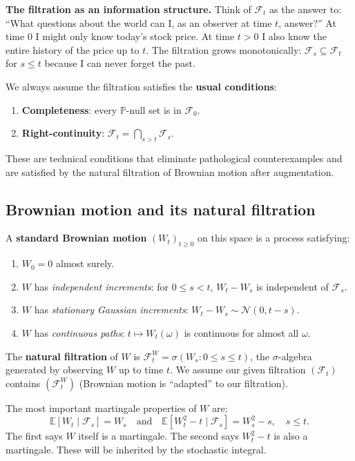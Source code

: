 \documentclass[11pt,a4paper]{article}
\theoremstyle{definition}
\theoremstyle{plain}
\theoremstyle{remark}
\newcommand{\E}{\mathbb{E}}
\newcommand{\Prob}{\mathbb{P}}
\newcommand{\F}{\mathcal{F}}
\begin{document}
\begin{tutobox}
\textbf{The filtration as an information structure.}
Think of $\F_t$ as the answer to: ``What questions about the world can I, as an observer at time $t$, answer?'' At time 0 I might only know today's stock price. At time $t > 0$ I also know the entire history of the price up to $t$. The filtration grows monotonically: $\F_s \subseteq \F_t$ for $s \leq t$ because I can never forget the past.
\end{tutobox}

We always assume the filtration satisfies the \textbf{usual conditions}:
\begin{enumerate}[label=(\roman*)]
  \item \textbf{Completeness}: every $\Prob$-null set is in $\F_0$.
  \item \textbf{Right-continuity}: $\F_t = \bigcap_{s > t} \F_s$.
\end{enumerate}
These are technical conditions that eliminate pathological counterexamples and are satisfied by the natural filtration of Brownian motion after augmentation.

\subsection{Brownian motion and its natural filtration}

A \textbf{standard Brownian motion} $(W_t)_{t \geq 0}$ on this space is a process satisfying:
\begin{enumerate}[label=(\roman*)]
  \item $W_0 = 0$ almost surely.
  \item $W$ has \emph{independent increments}: for $0 \leq s < t$, $W_t - W_s$ is independent of $\F_s$.
  \item $W$ has \emph{stationary Gaussian increments}: $W_t - W_s \sim \mathcal{N}(0, t-s)$.
  \item $W$ has \emph{continuous paths}: $t \mapsto W_t(\omega)$ is continuous for almost all $\omega$.
\end{enumerate}

The \textbf{natural filtration} of $W$ is $\F_t^W = \sigma(W_s : 0 \leq s \leq t)$, the $\sigma$-algebra generated by observing $W$ up to time $t$. We assume our given filtration $(\F_t)$ contains $(\F_t^W)$ (Brownian motion is ``adapted'' to our filtration).

The most important martingale properties of $W$ are:
\begin{equation}
  \label{eq:BM-mart}
  \E[W_t \mid \F_s] = W_s \quad \text{and} \quad \E[W_t^2 - t \mid \F_s] = W_s^2 - s, \quad s \leq t.
\end{equation}
The first says $W$ itself is a martingale. The second says $W_t^2 - t$ is also a martingale. These will be inherited by the stochastic integral.
\end{document}
